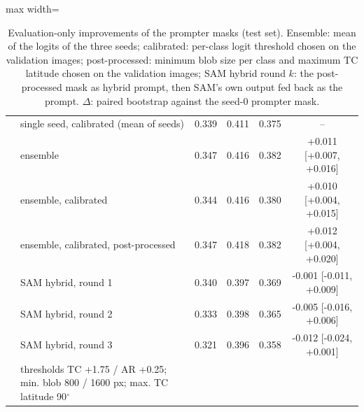 \begin{table}[htbp]
\begin{adjustbox}{max width=\linewidth}
\begin{tabular}{llcccc}
 & single seed, calibrated (mean of seeds) & 0.339 & 0.411 & 0.375 & -- \\
 & ensemble & 0.347 & 0.416 & 0.382 & +0.011 [+0.007, +0.016] \\
 & ensemble, calibrated & 0.344 & 0.416 & 0.380 & +0.010 [+0.004, +0.015] \\
 & ensemble, calibrated, post-processed & 0.347 & 0.418 & 0.382 & +0.012 [+0.004, +0.020] \\
 & SAM hybrid, round 1 & 0.340 & 0.397 & 0.369 & -0.001 [-0.011, +0.009] \\
 & SAM hybrid, round 2 & 0.333 & 0.398 & 0.365 & -0.005 [-0.016, +0.006] \\
 & SAM hybrid, round 3 & 0.321 & 0.396 & 0.358 & -0.012 [-0.024, +0.001] \\
 & \footnotesize thresholds TC +1.75 / AR +0.25; min. blob 800 / 1600 px; max. TC latitude 90$^\circ$ &  &  &  &  \\
\bottomrule
\end{tabular}
\end{adjustbox}
\caption{Evaluation-only improvements of the prompter masks (test set). Ensemble: mean of the logits of the three seeds; calibrated: per-class logit threshold chosen on the validation images; post-processed: minimum blob size per class and maximum TC latitude chosen on the validation images; SAM hybrid round $k$: the post-processed mask as hybrid prompt, then SAM's own output fed back as the prompt. $\Delta$: paired bootstrap against the seed-0 prompter mask.}
\label{tab:posthoc_infused_mlp1}
\end{table}
